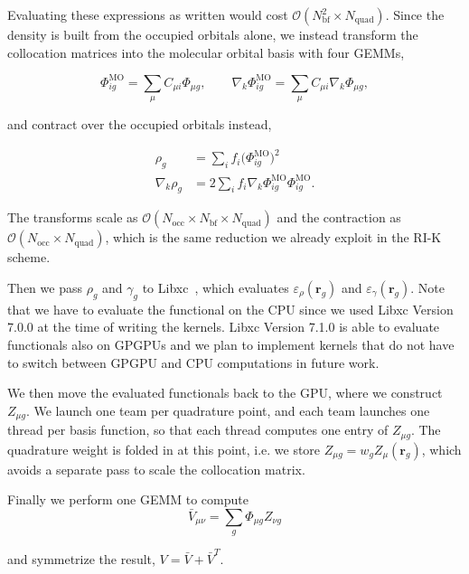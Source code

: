 \documentclass{article}
\begin{document}
Evaluating these expressions as written would cost
\( \mathcal O(N_\text{bf}^2 \times N_\text{quad}) \). Since the density
is built from the occupied orbitals alone, we instead transform the
collocation matrices into the molecular orbital basis with four GEMMs,

\begin{equation}
  \Phi^\text{MO}_{i g} = \sum_\mu C_{\mu i}\Phi_{\mu g},
  \qquad
  \nabla_k\Phi^\text{MO}_{i g} = \sum_\mu C_{\mu i}\nabla_k\Phi_{\mu g},
\end{equation}

and contract over the occupied orbitals instead,

\begin{align}
  \rho_g &= \sum_i f_i \big(\Phi^\text{MO}_{i g}\big)^2 \\
  \nabla_k\rho_g &= 2\sum_i f_i \nabla_k\Phi^\text{MO}_{i g}
  \Phi^\text{MO}_{i g}.
\end{align}

The transforms scale as \( \mathcal O(N_\text{occ} \times N_\text{bf}
\times N_\text{quad}) \) and the contraction as \( \mathcal
O(N_\text{occ} \times N_\text{quad}) \), which is the same reduction we
already exploit in the RI-K scheme.

Then we pass \( \rho_g  \) and \( \gamma_g \) to
Libxc~\cite{Lehtola2018libxc}, which evaluates
\( \varepsilon_\rho(\mathbf r_g) \) and
\( \varepsilon_\gamma(\mathbf r_g)  \). Note that we have to evaluate
the functional on the CPU since we used Libxc Version 7.0.0 at the time of
writing the kernels. Libxc Version 7.1.0 is able to evaluate functionals
also on GPGPUs and we plan to implement kernels that do not have to
switch between GPGPU and CPU computations in future work.

We then move the evaluated functionals back to the GPU, where we
construct \( Z_{\mu g} \). We launch one team per quadrature point, and
each team launches one thread per basis function, so that each thread
computes one entry of \( Z_{\mu g} \). The quadrature weight is folded
in at this point, i.e. we store \( Z_{\mu g} = w_g Z_\mu(\mathbf r_g)
\), which avoids a separate pass to scale the collocation matrix.

Finally we perform one GEMM to compute
\begin{equation}
  \bar V_{\mu \nu } = \sum_g \Phi_{\mu g} Z_{\nu g}
\end{equation}

and symmetrize the result, \( V = \bar V + \bar V^T \).
\end{document}
